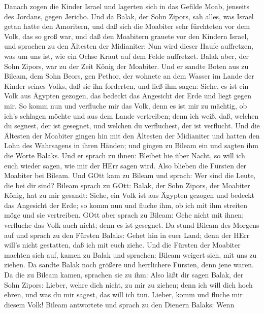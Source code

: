  Danach zogen die Kinder Israel und lagerten sich in das
Gefilde Moab, jenseits des Jordans, gegen Jericho.  Und da
Balak, der Sohn Zipors, sah alles, was Israel getan hatte den Amoritern,
 und daß sich die Moabiter sehr fürchteten vor dem Volk, das
so groß war, und daß den Moabitern grauete vor den Kindern Israel,
 und sprachen zu den Ältesten der Midianiter: Nun wird
dieser Haufe auffretzen, was um uns ist, wie ein Ochse Kraut auf dem
Felde auffretzet. Balak aber, der Sohn Zipors, war zu der Zeit König der
Moabiter.  Und er sandte Boten aus zu Bileam, dem Sohn
Beors, gen Pethor, der wohnete an dem Wasser im Lande der Kinder seines
Volks, daß sie ihn forderten, und ließ ihm sagen: Siehe, es ist ein Volk
aus Ägypten gezogen, das bedeckt das Angesicht der Erde und liegt gegen
mir.  So komm nun und verfluche mir das Volk, denn es ist
mir zu mächtig, ob ich's schlagen möchte und aus dem Lande vertreiben;
denn ich weiß, daß, welchen du segnest, der ist gesegnet, und welchen du
verfluchest, der ist verflucht.  Und die Ältesten der
Moabiter gingen hin mit den Ältesten der Midianiter und hatten den Lohn
des Wahrsagens in ihren Händen; und gingen zu Bileam ein und sagten ihm
die Worte Balaks.  Und er sprach zu ihnen: Bleibet hie über
Nacht, so will ich euch wieder sagen, wie mir der HErr sagen wird. Also
blieben die Fürsten der Moabiter bei Bileam.  Und GOtt kam
zu Bileam und sprach: Wer sind die Leute, die bei dir sind?
 Bileam sprach zu GOtt: Balak, der Sohn Zipors, der
Moabiter König, hat zu mir gesandt:  Siehe, ein Volk ist
aus Ägypten gezogen und bedeckt das Angesicht der Erde; so komm nun und
fluche ihm, ob ich mit ihm streiten möge und sie vertreiben.
 GOtt aber sprach zu Bileam: Gehe nicht mit ihnen;
verfluche das Volk auch nicht; denn es ist gesegnet.  Da
stund Bileam des Morgens auf und sprach zu den Fürsten Balaks: Gehet hin
in euer Land; denn der HErr will's nicht gestatten, daß ich mit euch
ziehe.  Und die Fürsten der Moabiter machten sich auf,
kamen zu Balak und sprachen: Bileam weigert sich, mit uns zu ziehen.
 Da sandte Balak noch größere und herrlichere Fürsten, denn
jene waren.  Da die zu Bileam kamen, sprachen sie zu ihm:
Also läßt dir sagen Balak, der Sohn Zipors: Lieber, wehre dich nicht, zu
mir zu ziehen;  denn ich will dich hoch ehren, und was du
mir sagest, das will ich tun. Lieber, komm und fluche mir diesem Volk!
 Bileam antwortete und sprach zu den Dienern Balaks: Wenn
